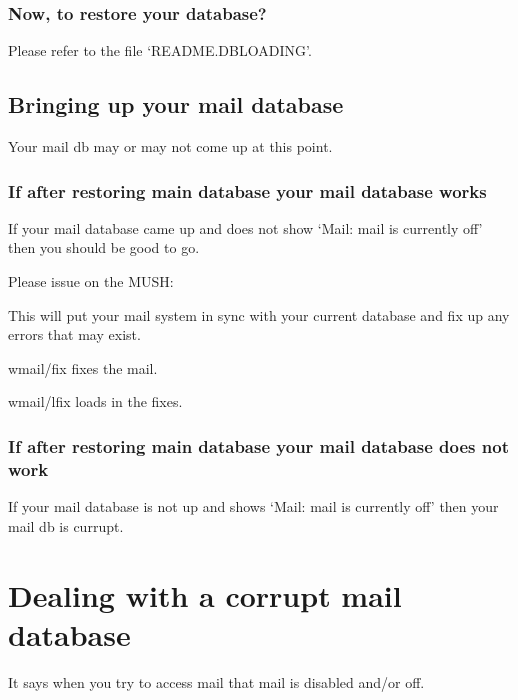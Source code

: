 \documentclass[letterpaper,10pt,english]{sphinxmanual}
\begin{document}
\subsubsection{Now, to restore your database?}
\label{\detokenize{troubleshooting:now-to-restore-your-database}}
\sphinxAtStartPar
Please refer to the file ‘README.DBLOADING’.


\subsection{Bringing up your mail database}
\label{\detokenize{troubleshooting:bringing-up-your-mail-database}}
\sphinxAtStartPar
Your mail db may or may not come up at this point.


\subsubsection{If after restoring main database your mail database works}
\label{\detokenize{troubleshooting:if-after-restoring-main-database-your-mail-database-works}}
\sphinxAtStartPar
If your mail database came up and does not show
‘Mail: mail is currently off’ then you should be good to go.

\sphinxAtStartPar
Please issue on the MUSH:

\begin{sphinxVerbatim}[commandchars=\\\{\}]
\end{sphinxVerbatim}

\sphinxAtStartPar
This will put your mail system in sync with your current database and
fix up any errors that may exist.

\sphinxAtStartPar
wmail/fix fixes the mail.

\sphinxAtStartPar
wmail/lfix loads in the fixes.


\subsubsection{If after restoring main database your mail database does not work}
\label{\detokenize{troubleshooting:if-after-restoring-main-database-your-mail-database-does-not-work}}
\sphinxAtStartPar
If your mail database is not up and shows ‘Mail: mail is currently off’ then your mail db is currupt.


\section{Dealing with a corrupt mail database}
\label{\detokenize{troubleshooting:dealing-with-a-corrupt-mail-database}}
\sphinxAtStartPar
It says when you try to access mail that mail is disabled and/or off.
\end{document}

